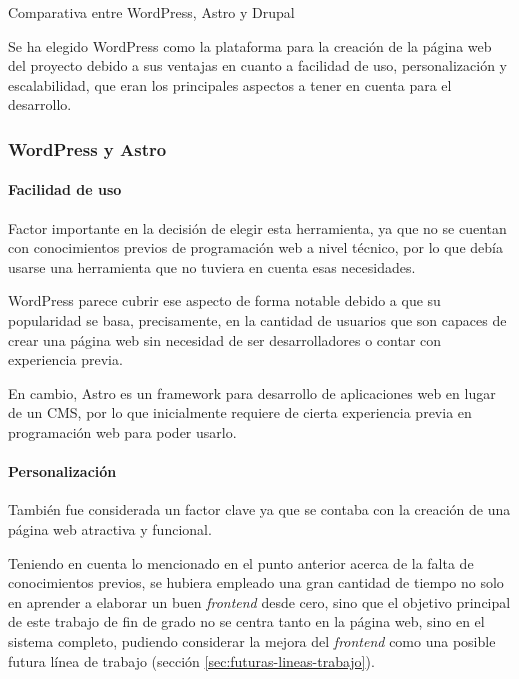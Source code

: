\begin{table}[!htbp]
                \caption{Comparativa entre WordPress, Astro y Drupal}
                \label{tab:wordpress-vs-astro-vs-drupal}
            \end{table}

            Se ha elegido WordPress como la plataforma para la creación de la página web del proyecto debido a sus ventajas en cuanto a facilidad de uso, personalización y escalabilidad, que eran los principales aspectos a tener en cuenta para el desarrollo.
            
            \subsubsection{WordPress y Astro}

                \paragraph{Facilidad de uso}
                    
                    Factor importante en la decisión de elegir esta herramienta, ya que no se cuentan con conocimientos previos de programación web a nivel técnico, por lo que debía usarse una herramienta que no tuviera en cuenta esas necesidades.
                    
                    WordPress parece cubrir ese aspecto de forma notable debido a que su popularidad se basa, precisamente, en la cantidad de usuarios que son capaces de crear una página web sin necesidad de ser desarrolladores o contar con experiencia previa.

                    En cambio, Astro \cite{astro} es un framework para desarrollo de aplicaciones web en lugar de un CMS, por lo que inicialmente requiere de cierta experiencia previa en programación web para poder usarlo.
                
                \paragraph{Personalización}
                
                    También fue considerada un factor clave ya que se contaba con la creación de una página web atractiva y funcional.
                    
                    Teniendo en cuenta lo mencionado en el punto anterior acerca de la falta de conocimientos previos, se hubiera empleado una gran cantidad de tiempo no solo en aprender a elaborar un buen \textit{frontend} desde cero, sino que el objetivo principal de este trabajo de fin de grado no se centra tanto en la página web, sino en el sistema completo, pudiendo considerar la mejora del \textit{frontend} como una posible futura línea de trabajo (sección \ref{sec:futuras-lineas-trabajo}).
                
